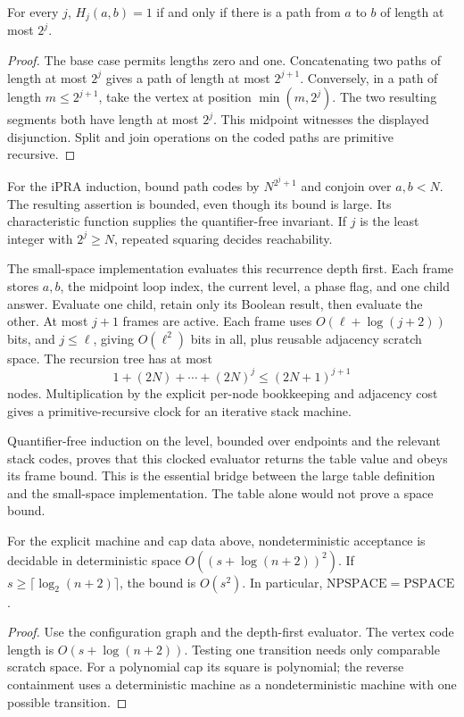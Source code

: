 \begin{theorem}
For every $j$, $H_j(a,b)=1$ if and only if there is a path from $a$ to $b$
of length at most $2^j$.
\end{theorem}
\begin{proof}
The base case permits lengths zero and one. Concatenating two paths of
length at most $2^j$ gives a path of length at most $2^{j+1}$. Conversely,
in a path of length $m\leq2^{j+1}$, take the vertex at position
$\min(m,2^j)$. The two resulting segments both have length at most $2^j$.
This midpoint witnesses the displayed disjunction. Split and join operations
on the coded paths are primitive recursive.
\end{proof}

For the iPRA induction, bound path codes by $N^{2^j+1}$ and conjoin over
$a,b<N$. The resulting assertion is bounded, even though its bound is large.
Its characteristic function supplies the quantifier-free invariant.
If $j$ is the least integer with $2^j\geq N$, repeated squaring decides
reachability.

The small-space implementation evaluates this recurrence depth first. Each
frame stores $a,b$, the midpoint loop index, the current level, a phase flag,
and one child answer. Evaluate one child, retain only its Boolean result,
then evaluate the other. At most $j+1$ frames are active. Each frame uses
$O(\ell+\log(j+2))$ bits, and $j\leq\ell$, giving $O(\ell^2)$ bits in all,
plus reusable adjacency scratch space. The recursion tree has at most
\[
 1+(2N)+\cdots+(2N)^j\leq(2N+1)^{j+1}
\]
nodes. Multiplication by the explicit per-node bookkeeping and adjacency
cost gives a primitive-recursive clock for an iterative stack machine.

Quantifier-free induction on the level, bounded over endpoints and the
relevant stack codes, proves that this clocked evaluator returns the table
value and obeys its frame bound. This is the essential bridge between the
large table definition and the small-space implementation. The table alone
would not prove a space bound.

\begin{theorem}
For the explicit machine and cap data above, nondeterministic acceptance is
decidable in deterministic space
$O((s+\log(n+2))^2)$. If $s\geq\lceil\log_2(n+2)\rceil$, the bound is
$O(s^2)$. In particular, $\mathrm{NPSPACE}=\mathrm{PSPACE}$.
\end{theorem}
\begin{proof}
Use the configuration graph and the depth-first evaluator. The vertex code
length is $O(s+\log(n+2))$. Testing one transition needs only comparable
scratch space. For a polynomial cap its square is polynomial; the reverse
containment uses a deterministic machine as a nondeterministic machine with
one possible transition.
\end{proof}

